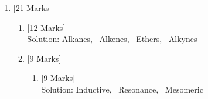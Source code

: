 \documentclass[10pt]{article}
\begin{document}
\begin{enumerate}
\begin{enumerate}
\end{enumerate}
\item {}\hfill
[21 Marks]
\begin{enumerate}\item {}\hfill
[12 Marks]
\\Solution: Alkanes, \ Alkenes, \ Ethers, \ Alkynes\\\vspace*{10pt}\item {}\hfill
[9 Marks]
\begin{enumerate}\item {}\hfill
[9 Marks]
\\Solution: Inductive, \ Resonance, \ Mesomeric\\\vspace*{10pt}\end{enumerate}
\end{enumerate}
\end{enumerate}
\end{document}

